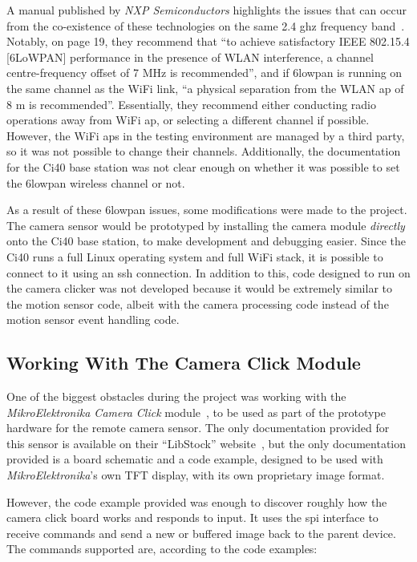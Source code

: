A manual published by \textit{NXP Semiconductors} highlights the issues that
can occur from the co-existence of these technologies on the same 2.4
\acrshort{ghz} frequency band~\cite{nxp2013ieee802154coexistence}. Notably,
on page 19, they recommend that ``to achieve satisfactory IEEE 802.15.4
[6LoWPAN] performance in the presence of WLAN interference, a channel
centre-frequency offset of 7 MHz is recommended'', and if \gls{6lowpan} is
running on the same channel as the WiFi link, ``a physical separation from
the WLAN \acrfull{ap} of 8 m is recommended''. Essentially, they recommend
either conducting radio operations away from WiFi \acrshort{ap}, or selecting
a different channel if possible. However, the WiFi \acrshort{ap}s in the
testing environment are managed by a third party, so it was not possible to
change their channels. Additionally, the documentation for the Ci40 base
station was not clear enough on whether it was possible to set the
\gls{6lowpan} wireless channel or not.

As a result of these \gls{6lowpan} issues, some modifications were made to
the project. The camera sensor would be prototyped by installing the camera
module \textit{directly} onto the Ci40 base station, to make development and
debugging easier. Since the Ci40 runs a full Linux operating system and full
WiFi stack, it is possible to connect to it using an \acrfull{ssh}
connection. In addition to this, code designed to run on the camera clicker
was not developed because it would be extremely similar to the motion sensor
code, albeit with the camera processing code instead of the motion sensor
event handling code.

\subsection{Working With The Camera Click Module}
One of the biggest obstacles during the project was working with the
\textit{MikroElektronika Camera Click} module~\cite{cameraclick}, to be used
as part of the prototype hardware for the remote camera sensor. The only
documentation provided for this sensor is available on their ``LibStock''
website~\cite{cameraclickexamples}, but the only documentation provided is a
board schematic and a code example, designed to be used with
\textit{MikroElektronika}'s own TFT display, with its own proprietary image
format.

However, the code example provided was enough to discover roughly how the
camera click board works and responds to input. It uses the \acrshort{spi}
interface to receive commands and send a new or buffered image back to the
parent device. The commands supported are, according to the code examples:

